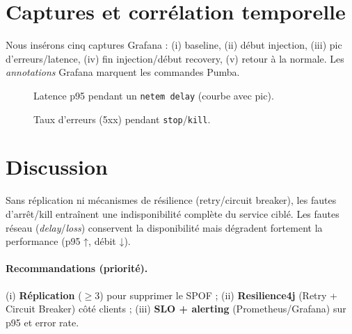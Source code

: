\section{Captures et corrélation temporelle}
Nous insérons cinq captures Grafana : (i) baseline, (ii) début injection, (iii) pic d'erreurs/latence,
(iv) fin injection/début recovery, (v) retour à la normale. Les \textit{annotations} Grafana marquent les commandes Pumba.

\begin{figure}[H]
\centering
{}
\caption{Latence p95 pendant un \texttt{netem delay} (courbe avec pic).}
\end{figure}

\begin{figure}[H]
\centering
{}
\caption{Taux d'erreurs (5xx) pendant \texttt{stop}/\texttt{kill}.}
\end{figure}

\section{Discussion}
Sans réplication ni mécanismes de résilience (retry/circuit breaker), les fautes d'arrêt/kill
entraînent une indisponibilité complète du service ciblé. Les fautes réseau (\textit{delay}/\textit{loss})
conservent la disponibilité mais dégradent fortement la performance (p95 ↑, débit ↓).

\paragraph{Recommandations (priorité).}
(i) \textbf{Réplication} ($\geq$3) pour supprimer le SPOF ; 
(ii) \textbf{Resilience4j} (Retry + Circuit Breaker) côté clients ; 
(iii) \textbf{SLO + alerting} (Prometheus/Grafana) sur p95 et error rate.